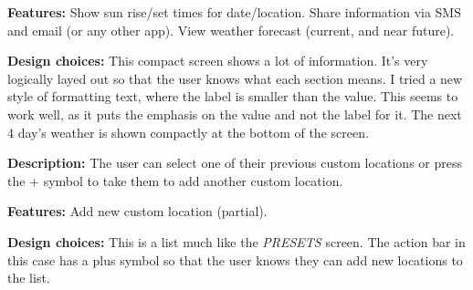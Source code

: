 \documentclass[11pt,english,numbers=endperiod,parskip=half]{scrartcl}
\begin{document}
\textbf{Features: }Show sun rise/set times for date/location. Share information
via SMS and email (or any other app). View weather forecast (current, and near future).

\textbf{Design choices: }This compact screen shows a lot of information. It's
very logically layed out so that the user knows what each section means. I tried
a new style of formatting text, where the label is smaller than the value. This
seems to work well, as it puts the emphasis on the value and not the label for it.
The next 4 day's weather is shown compactly at the bottom of the screen.

\begin{figure}[H]
\end{figure}
\bigskip
\textbf{Description: }The user can select one of their previous custom locations
or press the \(+\) symbol to take them to add another custom location.

\textbf{Features: }Add new custom location (partial).

\textbf{Design choices: }This is a list much like the \textit{PRESETS} screen.
The action bar in this case has a plus symbol so that the user knows they can
add new locations to the list.
\end{document}
